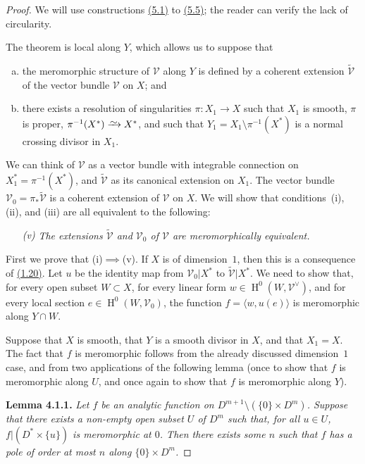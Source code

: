 \documentclass{report}
\newenvironment{itenv}[1]
  {\phantomsection\par\medskip\noindent\textbf{#1.}\itshape}
  {\par\medskip}
\renewcommand{\cal}[1]{{\mathcal{#1}}}
\newcommand{\simto}{\xrightarrow{\raisebox{-0.7ex}[0ex][0ex]{$\sim$}}}
\DeclareMathOperator{\HH}{H}
\begin{document}
\begin{proof}
  We will use constructions \hyperref[II.5.1]{(5.1)} to \hyperref[II.5.5]{(5.5)}; the reader can verify the lack of circularity.

  The theorem is local along $Y$, which allows us to suppose that
  \begin{enumerate}[a)]
    \item the meromorphic structure of $\cal{V}$ along $Y$ is defined by a coherent extension $\widetilde{\cal{V}}$ of the vector bundle $\cal{V}$ on $X$; and
    \item there exists a resolution of singularities $\pi\colon X_1\to X$ such that $X_1$ is smooth, $\pi$ is proper, $\pi^{-1}(X^*)\simto X^*$, and such that $Y_1=X_1\setminus\pi^{-1}(X^*)$ is a normal crossing divisor in $X_1$.
  \end{enumerate}

  We can think of $\cal{V}$ as a vector bundle with integrable connection on $X_1^*=\pi^{-1}(X^*)$, and $\widetilde{\cal{V}}$ as its canonical extension on $X_1$.
  The vector bundle $\cal{V}_0=\pi_*\widetilde{\cal{V}}$ is a coherent extension of $\cal{V}$ on $X$.
  We will show that conditions~(i), (ii), and (iii) are all equivalent to the following:
  \begin{enumerate}
    \item[\textit{(v)}] \textit{The extensions $\widetilde{\cal{V}}$ and $\cal{V}_0$ of $\cal{V}$ are meromorphically equivalent.}
  \end{enumerate}

  First we prove that \mbox{(i)$\implies$(v)}.
  If $X$ is of dimension~$1$, then this is a consequence of \hyperref[II.1.20]{(1.20)}.
  Let $u$ be the identity map from $\cal{V}_0|X^*$ to $\widetilde{\cal{V}}|X^*$.
  We need to show that, for every open subset $W\subset X$, for every linear form $w\in\HH^0(W,\cal{V}^\vee)$, and for every local section $e\in\HH^0(W,\cal{V}_0)$, the function $f=\langle w,u(e)\rangle$ is meromorphic along $Y\cap W$.

  Suppose that $X$ is smooth, that $Y$ is a smooth divisor in $X$, and that $X_1=X$.
  The fact that $f$ is meromorphic follows from the already discussed dimension~$1$ case, and from two applications of the following lemma (once to show that $f$ is meromorphic along $U$, and once again to show that $f$ is meromorphic along $Y$).

  \begin{itenv}{Lemma 4.1.1}
  \label{II.4.1.1}
    Let $f$ be an analytic function on $D^{m+1}\setminus(\{0\}\times D^m)$.
    Suppose that there exists a non-empty open subset $U$ of $D^m$ such that, for all $u\in U$, $f|(D^*\times\{u\})$ is meromorphic at $0$.
    Then there exists some $n$ such that $f$ has a pole of order at most $n$ along $\{0\}\times D^m$.
  \end{itenv}


\end{proof}
\end{document}
